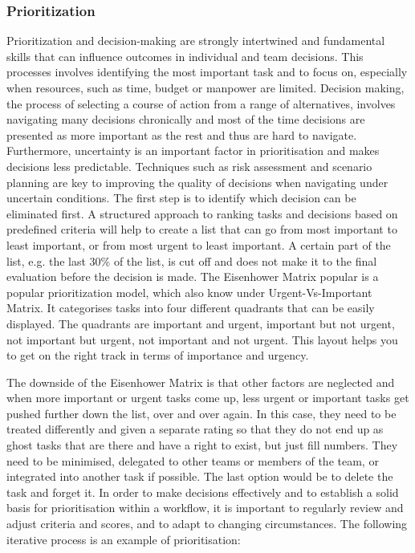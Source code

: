 \subsubsection{Prioritization}
Prioritization and decision-making are strongly intertwined and fundamental skills that can influence outcomes in individual and team decisions. This processes involves identifying the most important task and to focus on, especially when resources, such as time, budget or manpower are limited. Decision making, the process of selecting a course of action from a range of alternatives, involves navigating many decisions chronically and most of the time decisions are presented as more important as the rest and thus are hard to navigate. 
Furthermore, uncertainty is an important factor in prioritisation and makes decisions less predictable. Techniques such as risk assessment and scenario planning are key to improving the quality of decisions when navigating under uncertain conditions. 
\newline \noindent The first step is to identify which decision can be eliminated first. A structured approach to ranking tasks and decisions based on predefined criteria will help to create a list that can go from most important to least important, or from most urgent to least important. A certain part of the list, e.g. the last 30\% of the list, is cut off and does not make it to the final evaluation before the decision is made. 
\newline \noindent The Eisenhower Matrix popular is a popular prioritization model, which also know under Urgent-Vs-Important Matrix. It categorises tasks into four different quadrants that can be easily displayed. The quadrants are important and urgent, important but not urgent, not important but urgent, not important and not urgent. This layout helps you to get on the right track in terms of importance and urgency. 


\noindent The downside of the Eisenhower Matrix is that other factors are neglected and when more important or urgent tasks come up, less urgent or important tasks get pushed further down the list, over and over again. In this case, they need to be treated differently and given a separate rating so that they do not end up as ghost tasks that are there and have a right to exist, but just fill numbers. They need to be minimised, delegated to other teams or members of the team, or integrated into another task if possible. The last option would be to delete the task and forget it.
\newline \noindent In order to make decisions effectively and to establish a solid basis for prioritisation within a workflow, it is important to regularly review and adjust criteria and scores, and to adapt to changing circumstances. The following iterative process is an example of prioritisation: 

